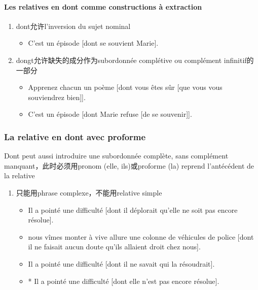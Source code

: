 \documentclass[UTF8]{report}
\begin{document}
\paragraph{Les relatives en dont comme constructions à extraction}
\begin{enumerate}
    \item dont允许l’inversion du sujet nominal
    \begin{itemize}
        \item C’est un épisode [dont se souvient Marie].
    \end{itemize}
    \item dongt允许缺失的成分作为subordonnée complétive ou complément infinitif的一部分
    \begin{itemize}
        \item Apprenez chacun un poème [dont vous êtes sûr [que vous vous souviendrez bien]].
        \item C’est un épisode [dont Marie refuse [de se souvenir]].
    \end{itemize}
\end{enumerate}


\subsubsection{La relative en dont avec proforme}
Dont peut aussi introduire une subordonnée complète, sans complément manquant，此时必须用pronom (elle, ils)或proforme (la) reprend l’antécédent de la relative
\begin{enumerate}
    \item 只能用phrase complexe，不能用relative simple
    \begin{itemize}
        \item Il a pointé une difficulté [dont il déplorait qu’elle ne soit pas encore résolue].
        \item nous vîmes monter à vive allure une colonne de véhicules de police [dont il ne faisait aucun doute qu’ils allaient droit chez nous].
        \item Il a pointé une difficulté [dont il ne savait qui la résoudrait].
        \item * Il a pointé une difficulté [dont elle n’est pas encore résolue].
    \end{itemize}
\end{enumerate}
\end{document}
